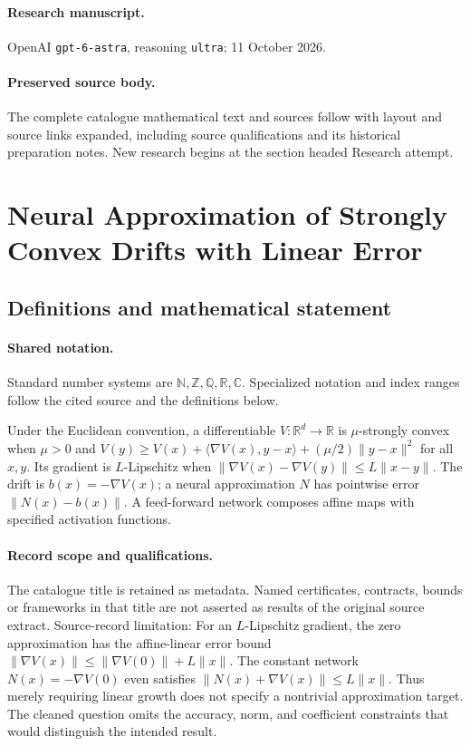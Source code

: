 \documentclass[11pt]{article}
\begin{document}
\paragraph{Research manuscript.} OpenAI \texttt{gpt-6-astra}, reasoning \texttt{ultra}; 11 October 2026.
\paragraph{Preserved source body.} The complete catalogue mathematical text and sources follow with layout and source links expanded, including source qualifications and its historical preparation notes. New research begins at the section headed Research attempt.

\section{Neural Approximation of Strongly Convex Drifts with Linear Error}\label{statement}

\subsection{Definitions and mathematical statement}

\paragraph{Shared notation.}Standard number systems are $\mathbb N,\mathbb Z,\mathbb Q,\mathbb R,\mathbb C$. Specialized notation and index ranges follow the cited source and the definitions below.


Under the Euclidean convention, a differentiable $V:\mathbb R^d\to\mathbb R$ is $\mu$-strongly convex when $\mu>0$ and $V(y)\ge V(x)+\langle\nabla V(x),y-x\rangle+(\mu/2)\|y-x\|^2$ for all $x,y$. Its gradient is $L$-Lipschitz when $\|\nabla V(x)-\nabla V(y)\|\le L\|x-y\|$. The drift is $b(x)=-\nabla V(x)$; a neural approximation $N$ has pointwise error $\|N(x)-b(x)\|$. A feed-forward network composes affine maps with specified activation functions.
\paragraph{Record scope and qualifications.}
The catalogue title is retained as metadata. Named certificates, contracts, bounds or frameworks in that title are not asserted as results of the original source extract.
Source-record limitation: For an $L$-Lipschitz gradient, the zero approximation has the affine-linear error bound $\|\nabla V(x)\|\le\|\nabla V(0)\|+L\|x\|$. The constant network $N(x)=-\nabla V(0)$ even satisfies $\|N(x)+\nabla V(x)\|\le L\|x\|$. Thus merely requiring linear growth does not specify a nontrivial approximation target. The cleaned question omits the accuracy, norm, and coefficient constraints that would distinguish the intended result.
\end{document}
